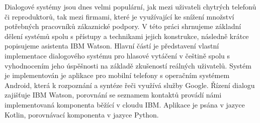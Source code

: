 \documentclass[12pt]{report}
\begin{document}

Dialogové systémy jsou dnes velmi populární, jak mezi uživateli chytrých
telefonů či reproduktorů, tak mezi firmami, které je využívající ke snížení
množství potřebných pracovníků zákaznické podpory. V této práci
shrnujeme základní dělení systémů spolu s přístupy a technikami
jejich konstrukce, následně krátce popisujeme asistenta IBM Watson.
Hlavní částí je představení vlastní implementace dialogového systému
pro hlasové vytáčení v češtině spolu s vyhodnocením jeho úspěšnosti
na základě zkušeností reálných uživatelů. Systém je implementován je aplikace
pro mobilní telefony s operačním systémem Android, která k rozpoznání
a syntéze řeči využívá služby Google. Řízení dialogu zajišťuje IBM Watson,
porovnání se seznamem kontaktů provádí námi implementovaná komponenta běžící
v cloudu IBM. Aplikace je psána v jazyce Kotlin, porovnávací komponenta
v jazyce Python.
\end{document}
